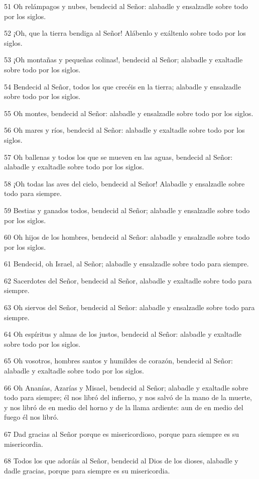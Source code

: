 \par 51 Oh relámpagos y nubes, bendecid al Señor: alabadle y ensalzadle sobre todo por los siglos.
\par 52 ¡Oh, que la tierra bendiga al Señor! Alábenlo y exáltenlo sobre todo por los siglos.
\par 53 ¡Oh montañas y pequeñas colinas!, bendecid al Señor; alabadle y exaltadle sobre todo por los siglos.
\par 54 Bendecid al Señor, todos los que crecéis en la tierra; alabadle y ensalzadle sobre todo por los siglos.
\par 55 Oh montes, bendecid al Señor: alabadle y ensalzadle sobre todo por los siglos.
\par 56 Oh mares y ríos, bendecid al Señor: alabadle y exaltadle sobre todo por los siglos.
\par 57 Oh ballenas y todos los que se mueven en las aguas, bendecid al Señor: alabadle y exaltadle sobre todo por los siglos.
\par 58 ¡Oh todas las aves del cielo, bendecid al Señor! Alabadle y ensalzadle sobre todo para siempre.
\par 59 Bestias y ganados todos, bendecid al Señor; alabadle y ensalzadle sobre todo por los siglos.
\par 60 Oh hijos de los hombres, bendecid al Señor: alabadle y ensalzadle sobre todo por los siglos.
\par 61 Bendecid, oh Israel, al Señor; alabadle y ensalzadle sobre todo para siempre.
\par 62 Sacerdotes del Señor, bendecid al Señor, alabadle y exaltadle sobre todo para siempre.
\par 63 Oh siervos del Señor, bendecid al Señor: alabadle y ensalzadle sobre todo para siempre.
\par 64 Oh espíritus y almas de los justos, bendecid al Señor: alabadle y exaltadle sobre todo por los siglos.
\par 65 Oh vosotros, hombres santos y humildes de corazón, bendecid al Señor: alabadle y exaltadle sobre todo por los siglos.
\par 66 Oh Ananías, Azarías y Misael, bendecid al Señor; alabadle y exaltadle sobre todo para siempre; él nos libró del infierno, y nos salvó de la mano de la muerte, y nos libró de en medio del horno y de la llama ardiente: aun de en medio del fuego él nos libró.
\par 67 Dad gracias al Señor porque es misericordioso, porque para siempre es su misericordia.
\par 68 Todos los que adoráis al Señor, bendecid al Dios de los dioses, alabadle y dadle gracias, porque para siempre es su misericordia.

